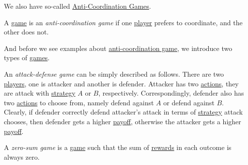 We also have so-called \hyperref[def:anti-coordination-game]{Anti-Coordination Games}.
\begin{definition}\label{def:anti-coordination-game}
	A  \hyperref[def:game]{game} is an \emph{anti-coordination game} if one \hyperref[def:player]{player} prefers to coordinate, and the other does not.
\end{definition}

And before we see examples about \hyperref[def:anti-coordination-game]{anti-coordination game}, we introduce two types of \hyperref[def:game]{games}.

\begin{definition}\label{def:attach-defense-game}
	An \emph{attack-defense game} can be simply described as follows. There are two \hyperref[def:player]{players}, one is attacker and another is defender. Attacker has two \hyperref[def:strategy]{actions}, they are attack with \hyperref[def:strategy]{strategy} \(A\) or \(B\), respectively. Correspondingly, defender also has two \hyperref[def:strategy]{actions} to choose from, namely defend against \(A\) or defend against \(B\). Clearly, if defender correctly defend attacker's attack in terms of \hyperref[def:strategy]{strategy} attack chooses, then defender gets a higher \hyperref[def:reward]{payoff}, otherwise the attacker gets a higher \hyperref[def:reward]{payoff}.
\end{definition}

\begin{definition}\label{def:zero-sum-game}
	A \emph{zero-sum game} is a \hyperref[def:game]{game} such that the sum of \hyperref[def:reward]{rewards} in each outcome is always zero.
\end{definition}

